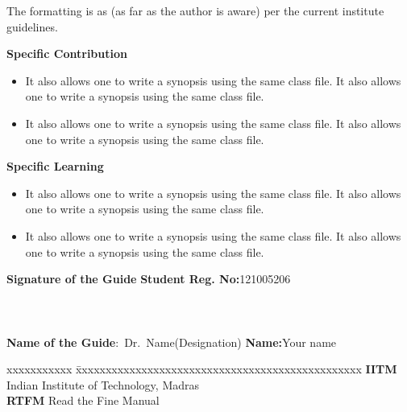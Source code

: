 \documentclass[a4paper, 12pt, oneside]{sastra}
\begin{document}
	The formatting is as (as far as the author is aware) per the current institute guidelines.
	
	\noindent \textbf{Specific Contribution}
	\begin{itemize}
		\item It also allows one to write a synopsis using the same class file. It also allows one to write a synopsis using the same class file.
		\item It also allows one to write a synopsis using the same class file. It also allows one to write a synopsis using the same class file.
	\end{itemize}
	\noindent \textbf{Specific Learning}
	\begin{itemize}
		\item It also allows one to write a synopsis using the same class file. It also allows one to write a synopsis using the same class file.
		\item It also allows one to write a synopsis using the same class file. It also allows one to write a synopsis using the same class file.
	\end{itemize}
	
	\vspace*{24pt}
	
	\noindent \textbf{Signature of the Guide} \hspace*{70mm} \textbf{Student Reg. No:}121005206\\
		\\
	\\
	\\
	\noindent \textbf{Name of the Guide}:~Dr.~Name(Designation) \hspace*{35mm} \textbf{Name:}Your name
	\pagebreak
	
	
	
	\begin{singlespace}
		\tableofcontents
		\thispagestyle{empty}
		
		
		\listoffigures
		\listoftables
	\end{singlespace}
	
	
	\abbreviations
	
	\noindent 
	\begin{tabbing}
		xxxxxxxxxxx \= xxxxxxxxxxxxxxxxxxxxxxxxxxxxxxxxxxxxxxxxxxxxxxxx \kill
		\textbf{IITM}   \> Indian Institute of Technology, Madras \\
		\textbf{RTFM} \> Read the Fine Manual \\
	\end{tabbing}
	
\end{document}
